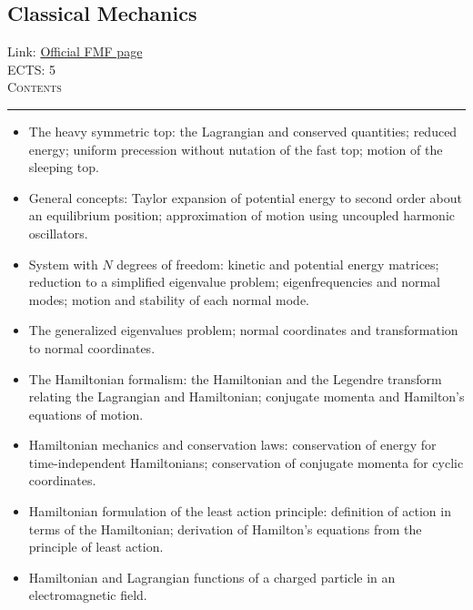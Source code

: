 \documentclass[11pt, a4paper]{article}
\newenvironment{course}[3]{
\subsection{#1}%
Link: \href{#2}{Official FMF page}\\%
ECTS: #3%
\vspace{1ex}
\\
{\large \textsc{Contents}}\\[-0.9ex]%
\rule{\textwidth}{0.5pt}
\vspace{-3ex}
}
{}
\newenvironment{chapter}[1]{
\begin{tcolorbox}[title=#1, breakable]
}
{\end{tcolorbox}}
\begin{document}
\begin{course}{Classical Mechanics}{https://www.fmf.uni-lj.si/en/study-physics/programmes/1fiz/2020/7000777/courses/1155/}{5}
\begin{chapter}{Rigid body dynamics}
\begin{itemize}
            \item The heavy symmetric top: the Lagrangian and conserved quantities; reduced energy; uniform precession without nutation of the fast top; motion of the sleeping top.
        \end{itemize}
    \end{chapter}

    \begin{chapter}{Small oscillations}
        \begin{itemize}
        
            \item General concepts: Taylor expansion of potential energy to second order about an equilibrium position; approximation of motion using uncoupled harmonic oscillators.

            \item System with $ N $ degrees of freedom: kinetic and potential energy matrices; reduction to a simplified eigenvalue problem; eigenfrequencies and normal modes; motion and stability of each normal mode.

            \item The generalized eigenvalues problem; normal coordinates and transformation to normal coordinates.
        
        \end{itemize}
    \end{chapter}

    \begin{chapter}{Hamiltonian mechanics}
        \begin{itemize}
        
            \item The Hamiltonian formalism: the Hamiltonian and the Legendre transform relating the Lagrangian and Hamiltonian; conjugate momenta and Hamilton's equations of motion.

            \item Hamiltonian mechanics and conservation laws: conservation of energy for time-independent Hamiltonians; conservation of conjugate momenta for cyclic coordinates.

            \item Hamiltonian formulation of the least action principle: definition of action in terms of the Hamiltonian; derivation of Hamilton's equations from the principle of least action.

            \item Hamiltonian and Lagrangian functions of a charged particle in an electromagnetic field.


\end{itemize}
\end{chapter}
\end{course}
\end{document}
